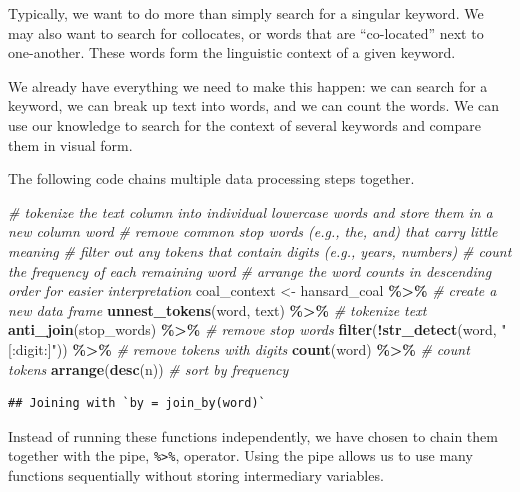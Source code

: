 \documentclass[
]{article}
\newenvironment{Shaded}{\begin{snugshade}}{\end{snugshade}}
\newcommand{\CommentTok}[1]{\textcolor[rgb]{0.56,0.35,0.01}{\textit{#1}}}
\newcommand{\FunctionTok}[1]{\textcolor[rgb]{0.13,0.29,0.53}{\textbf{#1}}}
\newcommand{\NormalTok}[1]{#1}
\newcommand{\OtherTok}[1]{\textcolor[rgb]{0.56,0.35,0.01}{#1}}
\newcommand{\SpecialCharTok}[1]{\textcolor[rgb]{0.81,0.36,0.00}{\textbf{#1}}}
\newcommand{\StringTok}[1]{\textcolor[rgb]{0.31,0.60,0.02}{#1}}
\begin{document}
Typically, we want to do more than simply search for a singular keyword.
We may also want to search for collocates, or words that are
``co-located'' next to one-another. These words form the linguistic
context of a given keyword.

We already have everything we need to make this happen: we can search
for a keyword, we can break up text into words, and we can count the
words. We can use our knowledge to search for the context of several
keywords and compare them in visual form.

The following code chains multiple data processing steps together.

\begin{Shaded}
\begin{Highlighting}[]
\CommentTok{\# tokenize the \textquotesingle{}text\textquotesingle{} column into individual lowercase words and store them in a new column \textquotesingle{}word\textquotesingle{}}
\CommentTok{\# remove common stop words (e.g., \textquotesingle{}the\textquotesingle{}, \textquotesingle{}and\textquotesingle{}) that carry little meaning}
\CommentTok{\# filter out any tokens that contain digits (e.g., years, numbers)}
\CommentTok{\# count the frequency of each remaining word}
\CommentTok{\# arrange the word counts in descending order for easier interpretation}
\NormalTok{coal\_context }\OtherTok{\textless{}{-}}\NormalTok{ hansard\_coal }\SpecialCharTok{\%\textgreater{}\%} \CommentTok{\# create a new data frame }
  \FunctionTok{unnest\_tokens}\NormalTok{(word, text) }\SpecialCharTok{\%\textgreater{}\%} \CommentTok{\# tokenize text}
  \FunctionTok{anti\_join}\NormalTok{(stop\_words) }\SpecialCharTok{\%\textgreater{}\%} \CommentTok{\# remove stop words}
  \FunctionTok{filter}\NormalTok{(}\SpecialCharTok{!}\FunctionTok{str\_detect}\NormalTok{(word, }\StringTok{"[:digit:]"}\NormalTok{)) }\SpecialCharTok{\%\textgreater{}\%} \CommentTok{\# remove tokens with digits}
  \FunctionTok{count}\NormalTok{(word) }\SpecialCharTok{\%\textgreater{}\%} \CommentTok{\# count tokens}
  \FunctionTok{arrange}\NormalTok{(}\FunctionTok{desc}\NormalTok{(n)) }\CommentTok{\# sort by frequency}
\end{Highlighting}
\end{Shaded}

\begin{verbatim}
## Joining with `by = join_by(word)`
\end{verbatim}

Instead of running these functions independently, we have chosen to
chain them together with the pipe, \texttt{\%\textgreater{}\%},
operator. Using the pipe allows us to use many functions sequentially
without storing intermediary variables.
\end{document}
